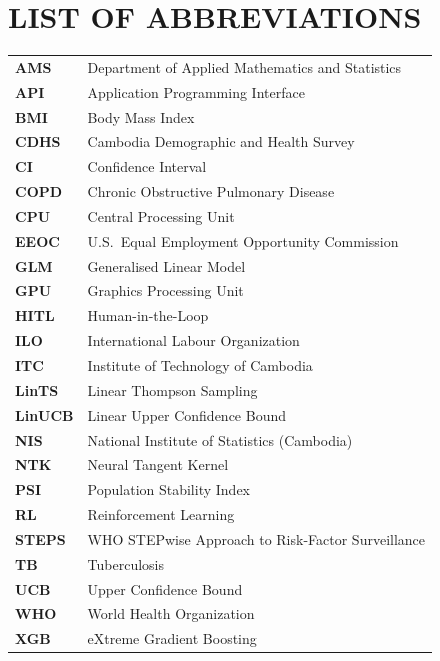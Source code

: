 \chapter*{LIST OF ABBREVIATIONS}
\begin{table}[ht]
\begin{tabular}{@{} >{\bfseries}l @{\hspace{1.5cm} \ } l @{}}
AMS    & Department of Applied Mathematics and Statistics \\
API    & Application Programming Interface \\
BMI    & Body Mass Index \\
CDHS   & Cambodia Demographic and Health Survey \\
CI     & Confidence Interval \\
COPD   & Chronic Obstructive Pulmonary Disease \\
CPU    & Central Processing Unit \\
EEOC   & U.S.\ Equal Employment Opportunity Commission \\
GLM    & Generalised Linear Model \\
GPU    & Graphics Processing Unit \\
HITL   & Human-in-the-Loop \\
ILO    & International Labour Organization \\
ITC    & Institute of Technology of Cambodia \\
LinTS  & Linear Thompson Sampling \\
LinUCB & Linear Upper Confidence Bound \\
NIS    & National Institute of Statistics (Cambodia) \\
NTK    & Neural Tangent Kernel \\
PSI    & Population Stability Index \\
RL     & Reinforcement Learning \\
STEPS  & WHO STEPwise Approach to Risk-Factor Surveillance \\
TB     & Tuberculosis \\
UCB    & Upper Confidence Bound \\
WHO    & World Health Organization \\
XGB    & eXtreme Gradient Boosting \\
\end{tabular}
\end{table}
